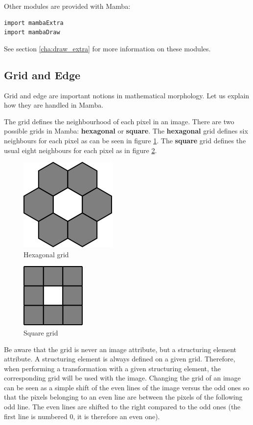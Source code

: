 \documentclass[a4paper,10pt,oneside]{article}
\begin{document}
Other modules are provided with Mamba:

\lstset{language=Python}
\begin{lstlisting}
import mambaExtra
import mambaDraw
\end{lstlisting}

See section \ref{cha:draw_extra} for more information on these modules.

\subsection{Grid and Edge}

Grid and edge are important notions in mathematical morphology. Let us explain
how they are handled in Mamba. 

The grid defines the neighbourhood of each pixel in an image. There are two 
possible grids in Mamba: \textbf{hexagonal} or \textbf{square}. The 
\textbf{hexagonal} grid defines six neighbours for each pixel as can be seen in 
figure \ref{fig:hxgrid}. The \textbf{square} grid defines the usual eight 
neighbours for each pixel as in figure \ref{fig:sqgrid}.

\begin{figure}
\centering
\includegraphics[scale=0.3]{hxGrid.png}
\caption{Hexagonal grid}
\label{fig:hxgrid}
\end{figure}

\begin{figure}
\centering
\includegraphics[scale=0.4]{sqGrid.png}
\caption{Square grid}
\label{fig:sqgrid}
\end{figure}

Be aware that the grid is never an image attribute, but a structuring element 
attribute. A structuring element is always defined on a given grid. Therefore, 
when performing a transformation with a given structuring element, the corresponding 
grid will be used with the image. Changing the grid of an image can be seen as a 
simple shift of the even lines of the image versus the odd ones so that the pixels 
belonging to an even line are between the pixels of the following odd line. The even 
lines are shifted to the right compared to the odd ones (the first line is numbered 0, 
it is therefore an even one).
\end{document}
